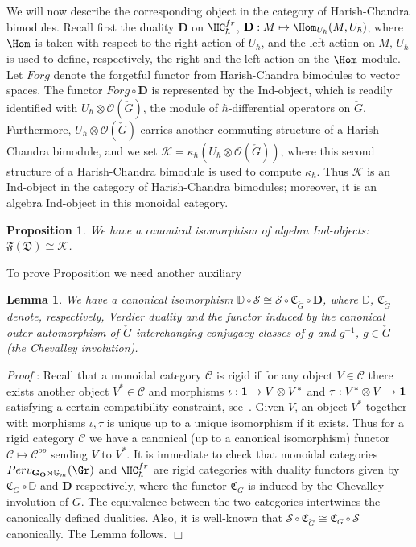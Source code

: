 \documentclass[11pt]{amsart}
\newtheorem{lem}{Lemma}
\newtheorem{prop}{Proposition}
\theoremstyle{definition}
\theoremstyle{remark}
\renewcommand{\O}{{\mathcal O}}
\theoremstyle{remark}
\newcommand{\cal}{\mathcal}
\newcommand{\<}{\langle}
\renewcommand{\>}{\rangle}
\newcommand{\LG}{{\check{G}}}
\renewcommand{\O}{{\cal O}}
\newcommand{\GO}{{\bf G_O}}
\newcommand{\Gm}{{{\mathbb G}_m}}
\newcommand{\HChfr}{\HC_\hbar^{fr}}
\renewcommand{\proof}{{\it Proof }}
\newcommand{\eqss}{{\mathcal{S}}}
\newcommand{\fufu}{{\mathfrak{F}}}
\newcommand{\ds}{{\mathfrak D}}
\newcommand{\Ver}{{\mathbb D}}
\newcommand{\prd}{{\mathbf D}}
\newcommand{\inv}{{\mathfrak C}}
\newcommand{\psf}{{\kappa_\hbar}}
\newcommand{\cK}{{\mathcal K }}
\newcommand{\PerSatake}{{Perv_{\GO\rtimes\Gm}(\Gr)}}
\begin{document}
We will now describe the corresponding object in the category of Harish-Chandra
bimodules. Recall first the duality $\prd$ on $\HChfr$,
$\prd:M\mapsto \Hom_{U_\hbar}(M,U_\hbar)$, where $\Hom$ is taken
with respect to the right action of
$U_\hbar$, and the left action on $M,\, U_\hbar$ is used to define,
respectively, the right and the left action on the $\Hom$ module.
Let $Forg$ denote the forgetful functor from Harish-Chandra bimodules
to vector spaces. The functor $Forg\circ \prd$ is represented
by the Ind-object, which is readily identified with $U_\hbar \otimes
\O(\LG)$, the module of $\hbar$-differential operators on $\LG$.
Furthermore,  $U_\hbar \otimes
\O(\LG)$ carries another commuting structure of a Harish-Chandra bimodule,
and we set $\cK=\psf(U_\hbar\otimes \O(\LG))$, where this second structure
of a  Harish-Chandra bimodule is used to compute $\psf$. 
 Thus
$\cK$ is an Ind-object in the category of Harish-Chandra bimodules;
moreover, it is an algebra Ind-object in this monoidal category.

\begin{prop}\label{fufudsK}
 We have a canonical isomorphism of algebra Ind-objects:
$\fufu(\ds)\cong \cK$.
\end{prop}

To prove Proposition we need another auxiliary

\begin{lem}\label{VerD} We have a canonical isomorphism
 $\Ver\circ \eqss\cong \eqss\circ   \inv_{\LG}\circ \prd$, where
$\Ver$, %
 $\inv_{\LG}$ denote, respectively, Verdier duality
and 
the functor induced by the canonical outer automorphism of $\LG$
interchanging conjugacy classes of $g$ and $g^{-1}$, $g\in \LG$
(the Chevalley involution).
\end{lem}


\proof: Recall that a monoidal category ${\mathcal C}$ is rigid 
if for any object $V\in {\mathcal C}$
there exists another object $V^*\in {\mathcal C}$ 
and morphisms $\iota:{\bf 1}\to V\otimes V^*$ and $\tau:V^*\otimes V\to 
{\bf 1}$ satisfying a certain compatibility constraint, see~\cite{DM}. 
Given $V$, an object $V^*$ together with morphisms $\iota,\tau$ is unique
up to a unique isomorphism if it exists. Thus for a rigid
category  ${{\mathcal C}}$ we have a canonical (up to a canonical isomorphism)
functor $ {{\mathcal C}}\mapsto  {{\mathcal C}}^{op}$ sending $V$ to $V^*$.
It is immediate to check that monoidal categories $\PerSatake$
and $\HC_\hbar^{fr}$ are rigid categories with duality functors given by
$\inv_G\circ \Ver$ and $\prd$ respectively,
where the functor $\inv_G$ is induced by the Chevalley involution 
of $G$. The equivalence between the two
categories intertwines the canonically defined dualities.
Also, it is well-known that $\eqss \circ \inv_{\LG}\cong \inv _G\circ
\eqss$ canonically. The Lemma follows. 
\hfill $\Box$
\end{document}
